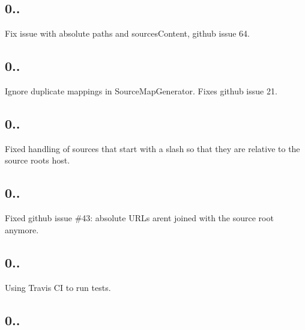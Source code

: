 \subsection*{0..}


\begin{DoxyItemize}
\item Fix issue with absolute paths and sources\+Content, github issue 64.
\end{DoxyItemize}

\subsection*{0..}


\begin{DoxyItemize}
\item Ignore duplicate mappings in Source\+Map\+Generator. Fixes github issue 21.
\end{DoxyItemize}

\subsection*{0..}


\begin{DoxyItemize}
\item Fixed handling of sources that start with a slash so that they are relative to the source root\textquotesingle{}s host.
\end{DoxyItemize}

\subsection*{0..}


\begin{DoxyItemize}
\item Fixed github issue \#43\+: absolute U\+R\+Ls aren\textquotesingle{}t joined with the source root anymore.
\end{DoxyItemize}

\subsection*{0..}


\begin{DoxyItemize}
\item Using Travis C\+I to run tests.
\end{DoxyItemize}

\subsection*{0..}


